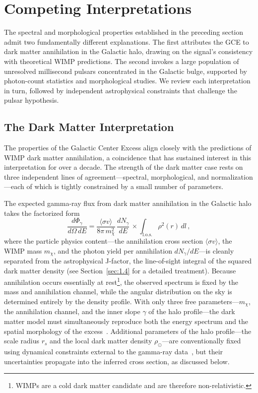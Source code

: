 
\section{Competing Interpretations}
\label{sec:4.2}

The spectral and morphological properties established in the preceding section admit two fundamentally different explanations.
The first attributes the GCE to dark matter annihilation in the Galactic halo, drawing on the signal's consistency with theoretical WIMP predictions.
The second invokes a large population of unresolved millisecond pulsars concentrated in the Galactic bulge, supported by photon-count statistics and morphological studies.
We review each interpretation in turn, followed by independent astrophysical constraints that challenge the pulsar hypothesis.

\subsection{The Dark Matter Interpretation}
\label{sec:4.2.1}

The properties of the Galactic Center Excess align closely with the predictions of WIMP dark matter annihilation, a coincidence that has sustained interest in this interpretation for over a decade.
The strength of the dark matter case rests on three independent lines of agreement---spectral, morphological, and normalization---each of which is tightly constrained by a small number of parameters.

The expected gamma-ray flux from dark matter annihilation in the Galactic halo takes the factorized form
\begin{equation}
	\frac{d\Phi_\gamma}{d\Omega\, dE} = \frac{\langle \sigma v \rangle}{8\pi\, m_\chi^2}\, \frac{dN_\gamma}{dE}\, \times \int_{\mathrm{l.o.s.}} \rho^2(r)\, dl\,,
	\label{eq:dm_flux_gce}
\end{equation}
where the particle physics content---the annihilation cross section $\langle \sigma v \rangle$, the WIMP mass $m_\chi$, and the photon yield per annihilation $dN_\gamma/dE$---is cleanly separated from the astrophysical J-factor, the line-of-sight integral of the squared dark matter density (see Section~\ref{sec:1.4} for a detailed treatment).
Because annihilation occurs essentially at rest\footnote{WIMPs are a cold dark matter candidate and are therefore non-relativistic.}, the observed spectrum is fixed by the mass and annihilation channel, while the angular distribution on the sky is determined entirely by the density profile.
With only three free parameters---$m_\chi$, the annihilation channel, and the inner slope $\gamma$ of the halo profile---the dark matter model must simultaneously reproduce both the energy spectrum and the spatial morphology of the excess~\cite{Daylan:2014rsa}.
Additional parameters of the halo profile---the scale radius $r_s$ and the local dark matter density $\rho_\odot$---are conventionally fixed using dynamical constraints external to the gamma-ray data~\cite{Abazajian:2014fta, Daylan:2014rsa}, but their uncertainties propagate into the inferred cross section, as discussed below.

